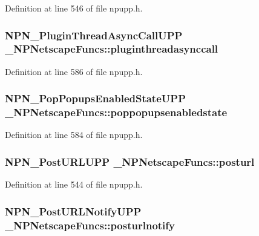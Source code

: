 Definition at line 546 of file npupp.h.

\hypertarget{struct___n_p_netscape_funcs_af08a09078a4d662d344fd294124b80f5}{
\subsubsection[{pluginthreadasynccall}]{\setlength{\rightskip}{0pt plus 5cm}NPN\_\-PluginThreadAsyncCallUPP {\bf \_\-NPNetscapeFuncs::pluginthreadasynccall}}}
\label{struct___n_p_netscape_funcs_af08a09078a4d662d344fd294124b80f5}


Definition at line 586 of file npupp.h.

\hypertarget{struct___n_p_netscape_funcs_a4e7dab223330e0d1c8a5596d11fc4816}{
\subsubsection[{poppopupsenabledstate}]{\setlength{\rightskip}{0pt plus 5cm}NPN\_\-PopPopupsEnabledStateUPP {\bf \_\-NPNetscapeFuncs::poppopupsenabledstate}}}
\label{struct___n_p_netscape_funcs_a4e7dab223330e0d1c8a5596d11fc4816}


Definition at line 584 of file npupp.h.

\hypertarget{struct___n_p_netscape_funcs_a4ab71f86b7c6f444afa64dec6f7ba76f}{
\subsubsection[{posturl}]{\setlength{\rightskip}{0pt plus 5cm}NPN\_\-PostURLUPP {\bf \_\-NPNetscapeFuncs::posturl}}}
\label{struct___n_p_netscape_funcs_a4ab71f86b7c6f444afa64dec6f7ba76f}


Definition at line 544 of file npupp.h.

\hypertarget{struct___n_p_netscape_funcs_a2e52b2a642eb0b8d9cacebf9d412c5ac}{
\subsubsection[{posturlnotify}]{\setlength{\rightskip}{0pt plus 5cm}NPN\_\-PostURLNotifyUPP {\bf \_\-NPNetscapeFuncs::posturlnotify}}}
\label{struct___n_p_netscape_funcs_a2e52b2a642eb0b8d9cacebf9d412c5ac}


